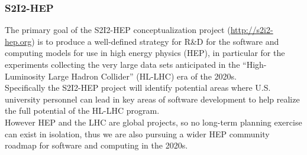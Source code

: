 \begin{frame}
\frametitle{S2I2-HEP}
The primary goal of the S2I2-HEP conceptualization project (\url{http://s2i2-hep.org}) is to produce a well-defined strategy for R\&D for the software and computing models for use in high energy physics (HEP), in particular for the experiments collecting the very large data sets anticipated in the ``High-Luminosity Large Hadron Collider'' (HL-LHC) era of the 2020s. \\
\vskip 0.15in
Specifically the S2I2-HEP project will identify potential areas where U.S. university personnel can lead in key areas of software development to help realize the full potential of the HL-LHC program. \\
\vskip 0.15in
However HEP and the LHC are global projects, so no long-term planning exercise can exist in isolation, thus we are also pursuing a wider HEP community roadmap for software and computing in the 2020s.
\end{frame}


